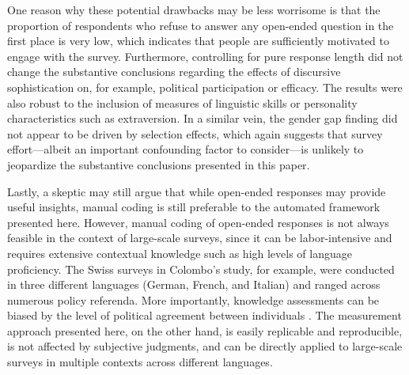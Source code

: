 One reason why these potential drawbacks may be less worrisome is that the proportion of respondents who refuse to answer any open-ended question in the first place is very low, which indicates that people are sufficiently motivated to engage with the survey. Furthermore, controlling for pure response length did not change the substantive conclusions regarding the effects of discursive sophistication on, for example, political participation or efficacy. The results were also robust to the inclusion of measures of linguistic skills or personality characteristics such as extraversion. In a similar vein, the gender gap finding did not appear to be driven by selection effects, which again suggests that survey effort---albeit an important confounding factor to consider---is unlikely to jeopardize the substantive conclusions presented in this paper.


Lastly, a skeptic may still argue that while open-ended responses may provide useful insights, manual coding is still preferable to the automated framework presented here. However, manual coding of open-ended responses is not always feasible in the context of large-scale surveys, since it can be labor-intensive and requires extensive contextual knowledge such as high levels of language proficiency. The Swiss surveys in Colombo's \citeyearpar{colombo2016justifications} study, for example, were conducted in three different languages (German, French, and Italian) and ranged across numerous policy referenda. More importantly, knowledge assessments can be biased by the level of political agreement between individuals \citep[e.g.,][]{ryan2011accuracy}. The measurement approach presented here, on the other hand, is easily replicable and reproducible, is not affected by subjective judgments, and can be directly applied to large-scale surveys in multiple contexts across different languages.

